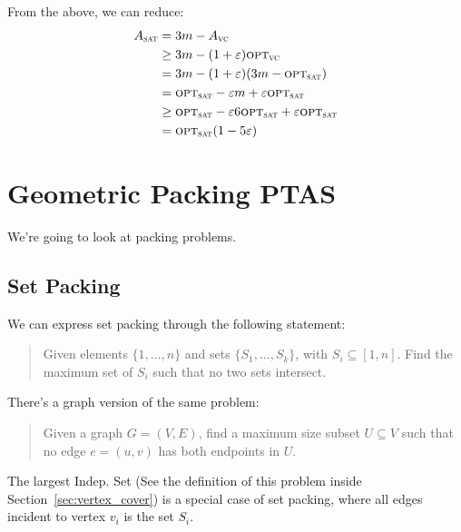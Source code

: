                     From the above, we can reduce:
                    \begin{align*}
                        A_\textsc{sat} &= 3m - A_\textsc{vc} \\
                        &\ge 3m - (1 + \varepsilon) \textsc{opt}_\textsc{vc} \\
                        &= 3m - (1+ \varepsilon)(3m - \textsc{opt}_\textsc{sat}) \\
                        &= \textsc{opt}_\textsc{sat} - \varepsilon m + \varepsilon \textsc{opt}_\textsc{sat} \\
                        &\ge \textsc{opt}_\textsc{sat} - \varepsilon 6 \textsc{opt}_\textsc{sat} + \varepsilon \textsc{opt}_\textsc{sat} \\
                        &= \textsc{opt}_\textsc{sat} (1 - 5 \varepsilon)
                    \end{align*}

        \chapter{Geometric Packing PTAS} %
        \label{cha:geometric_packing_ptas}
            We're going to look at packing problems.

            \section{Set Packing} %
            \label{sec:set_packing}
                We can express set packing through the following statement:
                \begin{quotation}
                    Given elements $\{1, \ldots, n\}$ and sets $\{S_1, \ldots, S_k\}$, with $S_i \subseteq [1, n]$.
                    Find the maximum set of $S_i$ such that no two sets intersect.
                \end{quotation}
                There's a graph version of the same problem:
                \begin{quotation}
                    Given a graph $G = (V, E)$, find a maximum size subset $U \subseteq V$ such that no edge $e = (u, v)$ has both endpoints in $U$.
                \end{quotation}
                The largest Indep. Set (See the definition of this problem inside Section~\ref{sec:vertex_cover}) is a special case of set packing, where all edges incident to vertex $v_i$ is the set $S_i$.

